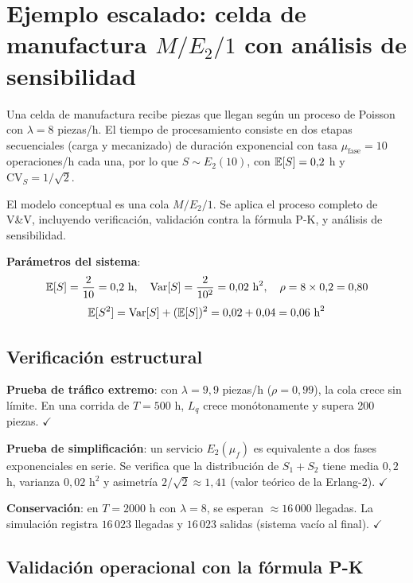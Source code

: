 \documentclass[11pt, letterpaper]{article}
\begin{document}
\section{Ejemplo escalado: celda de manufactura $M/E_2/1$ con análisis de sensibilidad}

\begin{ejemplobox}[Sistema]
Una celda de manufactura recibe piezas que llegan según un proceso de Poisson con $\lambda=8$ piezas/h. El tiempo de procesamiento consiste en dos etapas secuenciales (carga y mecanizado) de duración exponencial con tasa $\mu_{\text{fase}}=10$ operaciones/h cada una, por lo que $S \sim E_2(10)$, con $\mathbb{E}[S]=0{,}2$ h y $\text{CV}_S=1/\sqrt{2}$.

El modelo conceptual es una cola $M/E_2/1$. Se aplica el proceso completo de V\&V, incluyendo verificación, validación contra la fórmula P-K, y análisis de sensibilidad.
\end{ejemplobox}

\textbf{Parámetros del sistema}:
\[
\mathbb{E}[S] = \frac{2}{10} = 0{,}2 \text{ h}, \quad \operatorname{Var}[S] = \frac{2}{10^2} = 0{,}02 \text{ h}^2, \quad
\rho = 8 \times 0{,}2 = 0{,}80
\]
\[
\mathbb{E}[S^2] = \operatorname{Var}[S] + (\mathbb{E}[S])^2 = 0{,}02 + 0{,}04 = 0{,}06 \text{ h}^2
\]

\subsection{Verificación estructural}

\textbf{Prueba de tráfico extremo}: con $\lambda=9{,}9$ piezas/h ($\rho=0{,}99$), la cola crece sin límite. En una corrida de $T=500$ h, $L_q$ crece monótonamente y supera 200 piezas. $\checkmark$

\textbf{Prueba de simplificación}: un servicio $E_2(\mu_f)$ es equivalente a dos fases exponenciales en serie. Se verifica que la distribución de $S_1+S_2$ tiene media $0{,}2$ h, varianza $0{,}02$ h$^2$ y asimetría $2/\sqrt{2} \approx 1{,}41$ (valor teórico de la Erlang-2). $\checkmark$

\textbf{Conservación}: en $T=2000$ h con $\lambda=8$, se esperan $\approx 16\,000$ llegadas. La simulación registra $16\,023$ llegadas y $16\,023$ salidas (sistema vacío al final). $\checkmark$

\subsection{Validación operacional con la fórmula P-K}
\end{document}
